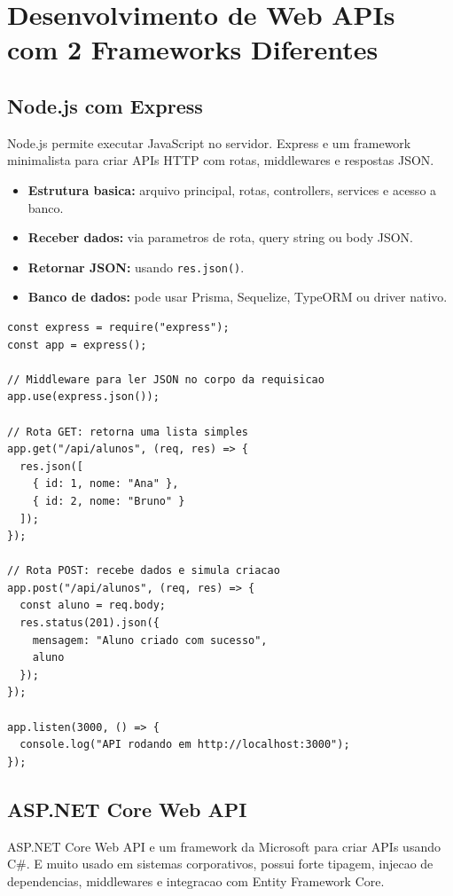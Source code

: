 \documentclass[12pt,a4paper]{article}
\begin{document}
\section{Desenvolvimento de Web APIs com 2 Frameworks Diferentes}

\subsection{Node.js com Express}

Node.js permite executar JavaScript no servidor. Express e um framework minimalista para criar APIs HTTP com rotas, middlewares e respostas JSON.

\begin{itemize}
  \item \textbf{Estrutura basica:} arquivo principal, rotas, controllers, services e acesso a banco.
  \item \textbf{Receber dados:} via parametros de rota, query string ou body JSON.
  \item \textbf{Retornar JSON:} usando \texttt{res.json()}.
  \item \textbf{Banco de dados:} pode usar Prisma, Sequelize, TypeORM ou driver nativo.
\end{itemize}

\begin{lstlisting}[caption={API simples com Node.js e Express}]
const express = require("express");
const app = express();

// Middleware para ler JSON no corpo da requisicao
app.use(express.json());

// Rota GET: retorna uma lista simples
app.get("/api/alunos", (req, res) => {
  res.json([
    { id: 1, nome: "Ana" },
    { id: 2, nome: "Bruno" }
  ]);
});

// Rota POST: recebe dados e simula criacao
app.post("/api/alunos", (req, res) => {
  const aluno = req.body;
  res.status(201).json({
    mensagem: "Aluno criado com sucesso",
    aluno
  });
});

app.listen(3000, () => {
  console.log("API rodando em http://localhost:3000");
});
\end{lstlisting}

\subsection{ASP.NET Core Web API}

ASP.NET Core Web API e um framework da Microsoft para criar APIs usando C\#. E muito usado em sistemas corporativos, possui forte tipagem, injecao de dependencias, middlewares e integracao com Entity Framework Core.
\end{document}
